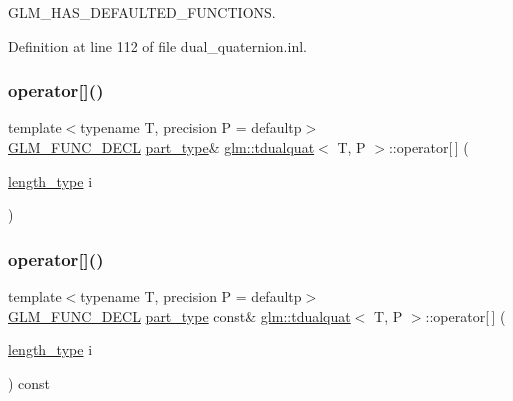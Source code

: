 G\+L\+M\+\_\+\+H\+A\+S\+\_\+\+D\+E\+F\+A\+U\+L\+T\+E\+D\+\_\+\+F\+U\+N\+C\+T\+I\+O\+NS. 



Definition at line 112 of file dual\+\_\+quaternion.\+inl.

\mbox{\label{structglm_1_1tdualquat_a249f53dd1ed32db9b6695b10e89de1f6}} 
\subsubsection{\texorpdfstring{operator[]()}{operator[]()}\hspace{0.1cm}{\footnotesize\ttfamily [1/2]}}
{\footnotesize\ttfamily template$<$typename T, precision P = defaultp$>$ \\
\mbox{\hyperlink{setup_8hpp_ab2d052de21a70539923e9bcbf6e83a51}{G\+L\+M\+\_\+\+F\+U\+N\+C\+\_\+\+D\+E\+CL}} \mbox{\hyperlink{structglm_1_1tdualquat_a496a3e08262a28863cf7b0609eee7e5b}{part\+\_\+type}}\& \mbox{\hyperlink{structglm_1_1tdualquat}{glm\+::tdualquat}}$<$ T, P $>$\+::operator\mbox{[}$\,$\mbox{]} (\begin{DoxyParamCaption}\item[{\mbox{\hyperlink{structglm_1_1tdualquat_a8100706ca94a1aa6611874787a9be0ca}{length\+\_\+type}}}]{i }\end{DoxyParamCaption})}

\mbox{\label{structglm_1_1tdualquat_a2243ffa45b172732765c9a473039ab72}} 
\subsubsection{\texorpdfstring{operator[]()}{operator[]()}\hspace{0.1cm}{\footnotesize\ttfamily [2/2]}}
{\footnotesize\ttfamily template$<$typename T, precision P = defaultp$>$ \\
\mbox{\hyperlink{setup_8hpp_ab2d052de21a70539923e9bcbf6e83a51}{G\+L\+M\+\_\+\+F\+U\+N\+C\+\_\+\+D\+E\+CL}} \mbox{\hyperlink{structglm_1_1tdualquat_a496a3e08262a28863cf7b0609eee7e5b}{part\+\_\+type}} const\& \mbox{\hyperlink{structglm_1_1tdualquat}{glm\+::tdualquat}}$<$ T, P $>$\+::operator\mbox{[}$\,$\mbox{]} (\begin{DoxyParamCaption}\item[{\mbox{\hyperlink{structglm_1_1tdualquat_a8100706ca94a1aa6611874787a9be0ca}{length\+\_\+type}}}]{i }\end{DoxyParamCaption}) const}



